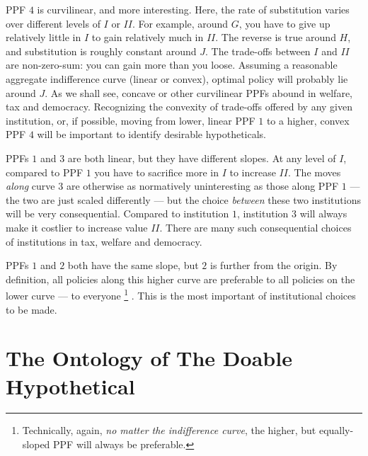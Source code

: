 	\gls{PPF} $4$ is curvilinear, and more interesting. 
	Here, the rate of substitution varies over different levels of $I$ or $II$.
	For example, around $G$, you have to give up relatively little in $I$ to gain relatively much in $II$. 
	The reverse is true around $H$, and substitution is roughly constant around $J$.
	The trade-offs between $I$ and $II$ are non-zero-sum: you can gain more than you loose.
	Assuming a reasonable aggregate indifference curve (linear or convex), optimal policy will probably lie around $J$.
	As we shall see, concave or other curvilinear \glspl{PPF} abound in welfare, tax and democracy.
	Recognizing the convexity of trade-offs offered by any given institution, or, if possible, moving from lower, linear \gls{PPF} $1$ to a higher, convex \gls{PPF} $4$ will be important to identify desirable hypotheticals.%
	
	\glspl{PPF} $1$ and $3$ are both linear, but they have different slopes. 
	At any level of $I$, compared to \gls{PPF} $1$ you have to sacrifice more in $I$ to increase $II$.
	The moves \emph{along} curve $3$ are otherwise as normatively uninteresting as those along \gls{PPF} $1$ --- the two are just scaled differently --- but the choice \emph{between} these two institutions will be very consequential.
	Compared to institution $1$, institution $3$ will always make it costlier to increase value $II$.
	There are many such consequential choices of institutions in tax, welfare and democracy. %
	
	\glspl{PPF} $1$ and $2$ both have the same slope, but $2$ is further from the origin.
	By definition, all policies along this higher curve are preferable to all policies on the lower curve --- to everyone
	\footnote{
		Technically, again, \emph{no matter the indifference curve}, the higher, but equally-sloped \gls{PPF} will always be preferable. 
	}
	.
	This is the most important of institutional choices to be made.
	



\section[Ontology]{The Ontology of The Doable Hypothetical} \label{sec:ontology} 

